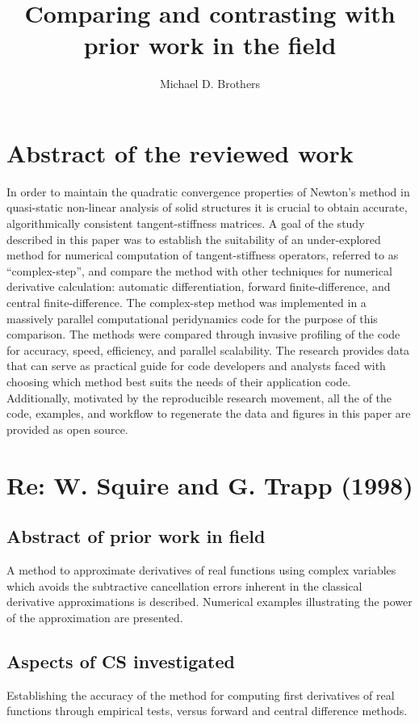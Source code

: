 \documentclass[10pt,letterpaper,draft]{article}
\author{Michael D. Brothers}
\title{Comparing and contrasting with prior work in the field}
\begin{document}
\section{Abstract of the reviewed work}

In order to maintain the quadratic convergence properties of Newton's method in
quasi-static non-linear analysis of solid structures it is crucial to obtain
accurate, algorithmically consistent tangent-stiffness matrices. A goal of the
study described in this paper was to establish the suitability of an
under-explored method for numerical computation of tangent-stiffness operators,
referred to as ``complex-step'', and compare the method with other techniques
for numerical derivative calculation: automatic differentiation, forward
finite-difference, and central finite-difference. The complex-step method was
implemented in a massively parallel computational peridynamics code for the
purpose of this comparison.  The methods were compared through invasive
profiling of the code for accuracy, speed, efficiency, and parallel
scalability. The research provides data that can serve as practical guide for
code developers and analysts faced with choosing which method best suits the
needs of their application code.  Additionally, motivated by the reproducible
research movement, all the of the code, examples, and workflow to regenerate
the data and figures in this paper are provided as open source.

\section{Re: W. Squire and G. Trapp (1998)}
\subsection{Abstract of prior work in field}

A method to approximate derivatives of real functions using complex variables
which avoids the subtractive cancellation errors inherent in the classical
derivative approximations is described. Numerical examples illustrating the
power of the approximation are presented.

\subsection{Aspects of CS investigated}

Establishing the accuracy of the method for computing first derivatives of
real functions through empirical tests, versus forward and central difference 
methods.
\end{document}
